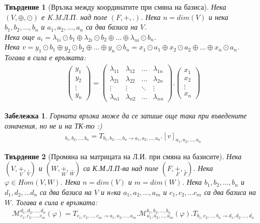 \documentclass[12pt]{article}
\newtheorem{remark}{{Забележка}}%
\newtheorem{proposition}{Твърдение}%
\begin{document}
\begin{proposition}[Връзка между координатите при смяна на базиса]
Нека \((V, \oplus, \odot)\) е K.M.Л.П. над поле \((F, +, .)\).
Нека \(n = dim(V)\) и нека
\(b_1, b_2, \dots, b_n\) и \(a_1, a_2, \dots, a_n\) са два базиса на \(V\). \\
Нека още \(a_i = \lambda_{1i} \odot b_1 \oplus \lambda_{2i} \odot b_2 \oplus \dots \oplus \lambda_{ni} \odot b_n\). \\
Нека \(v = y_1 \odot b_1 \oplus y_2 \odot b_2 \oplus \dots \oplus y_n \odot b_n
= x_1 \odot a_1 \oplus x_2 \odot a_2 \oplus \dots \oplus x_n \odot a_n\).
Тогава в сила е връзката:
\begin{align*}
\begin{pmatrix}
y_1 \\
y_2 \\
\vdots \\
y_n
\end{pmatrix}
=
\begin{pmatrix}
    \lambda_{11} & \lambda_{12} & \dots & \lambda_{1n} \\
    \lambda_{21} & \lambda_{22} & \dots & \lambda_{2n} \\
    \vdots    & \vdots  & \ddots & \vdots \\
    \lambda_{n1} & \lambda_{n2} & \dots & \lambda_{nn}
\end{pmatrix}
.
\begin{pmatrix}
x_1 \\
x_2 \\
\vdots \\
x_n
\end{pmatrix}
\end{align*}
\end{proposition}

\begin{remark}
Горната връзка може да се запише още така при въведените означения,
но не и на ТК-то :)
\begin{align*}
[v]_{b_1, b_2, \dots, b_n}
=
T_{b_1, b_2, \dots, b_n \to a_1, a_2, \dots, a_n}
.
[v]_{a_1, a_2, \dots, a_n}
\end{align*}
\end{remark}

\begin{proposition}[Промяна на матрицата на Л.И. при смяна на базисите]
Нека \((V, \underset{V}{+}, \underset{V}{.})\) и \((W, \underset{W}{+}, \underset{W}{.})\) са К.М.Л.П-ва над поле \((F, \underset{F}{+}, \underset{F}{.})\).
Нека \(\varphi \in Hom(V, W)\).
Нека \(n = dim(V)\) и \(m = dim(W)\).
Нека \(b_1, b_2, \dots, b_n\) и \(d_1, d_2, \dots d_n\) са два базиса на \(V\)
и нeка \(a_1, a_2, \dots, a_m\) и \(c_1, c_2, \dots c_m\) са два базиса на \(W\).
Тогава в сила е връзката:
\begin{align*}
\mathcal{M}_{c_1, c_2, \dots, c_m}^{d_1, d_2, \dots, d_n}(\varphi)
=
T_{c_1, c_2, \dots, c_m \to a_1, a_2, \dots, a_m}
.
\mathcal{M}_{a_1, a_2, \dots, a_m}^{b_1, b_2, \dots, b_n}(\varphi)
.
T_{b_1, c_2, \dots, b_n \to d_1, d_2, \dots, d_n}
\end{align*}
\end{proposition}
\end{document}
